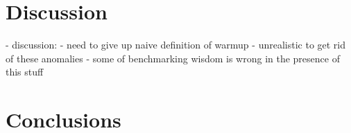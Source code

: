 \documentclass[10pt,preprint]{sigplanconf}
\begin{document}
\section{Discussion}
\label{sec:Discussion}

  - discussion:
    - need to give up naive definition of warmup
    - unrealistic to get rid of these anomalies
    - some of benchmarking wisdom is wrong in the presence of this stuff


\section{Conclusions}
\label{sec:conclusion}



\end{document}
